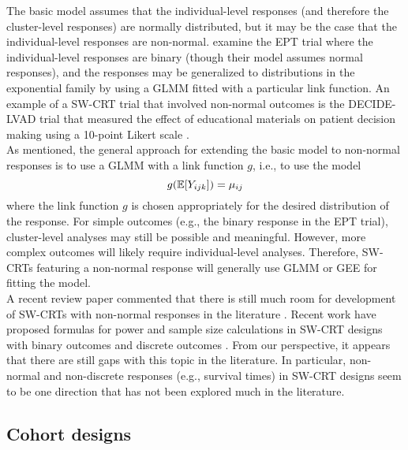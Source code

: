 \documentclass[10pt]{article}
\begin{document}
The basic model assumes that the individual-level responses (and therefore the cluster-level responses) are normally distributed, but it may be the case that the individual-level responses are non-normal. \citeauthor{Hussey:2007} examine the EPT trial where the individual-level responses are binary (though their model assumes normal responses), and the responses may be generalized to distributions in the exponential family by using a GLMM fitted with a particular link function. An example of a SW-CRT trial that involved non-normal outcomes is the DECIDE-LVAD trial that measured the effect of educational materials on patient decision making using a 10-point Likert scale \parencite{Allen:2018}.
\\

As mentioned, the general approach for extending the basic model to non-normal responses is to use a GLMM with a link function $g$, i.e., to use the model
\[
g(\mathbb{E}[Y_{ijk}]) = \mu_{ij}
\]
where the link function $g$ is chosen appropriately for the desired distribution of the response. For simple outcomes (e.g., the binary response in the EPT trial), cluster-level analyses may still be possible and meaningful. However, more complex outcomes will likely require individual-level analyses. Therefore, SW-CRTs featuring a non-normal response will generally use GLMM or GEE for fitting the model.
\\

A recent review paper commented that there is still much room for development of SW-CRTs with non-normal responses in the literature \parencite{Li:2021}. Recent work have proposed formulas for power and sample size calculations in SW-CRT designs with binary outcomes \parencite{Wang:2021} and discrete outcomes \parencite{Xia:2021}. From our perspective, it appears that there are still gaps with this topic in the literature. In particular, non-normal and non-discrete responses (e.g., survival times) in SW-CRT designs seem to be one direction that has not been explored much in the literature.

\subsection{Cohort designs}
\end{document}
